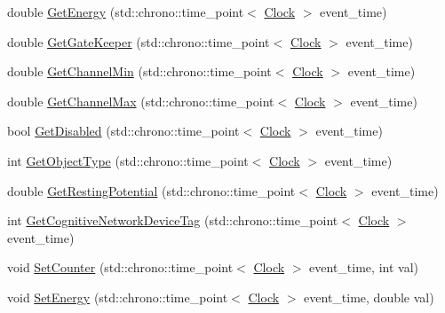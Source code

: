 \begin{DoxyCompactItemize}
\item 
double \mbox{\hyperlink{classCognitiveNetwork_af23b9bce2587ccf3c8204be33fc76c61}{Get\+Energy}} (std\+::chrono\+::time\+\_\+point$<$ \mbox{\hyperlink{universe_8h_a0ef8d951d1ca5ab3cfaf7ab4c7a6fd80}{Clock}} $>$ event\+\_\+time)
\item 
double \mbox{\hyperlink{classCognitiveNetwork_a3a9be1c6697d063b0836cdcdc7a2600c}{Get\+Gate\+Keeper}} (std\+::chrono\+::time\+\_\+point$<$ \mbox{\hyperlink{universe_8h_a0ef8d951d1ca5ab3cfaf7ab4c7a6fd80}{Clock}} $>$ event\+\_\+time)
\item 
double \mbox{\hyperlink{classCognitiveNetwork_ad7f5cc836340017d38c22b57e177fc91}{Get\+Channel\+Min}} (std\+::chrono\+::time\+\_\+point$<$ \mbox{\hyperlink{universe_8h_a0ef8d951d1ca5ab3cfaf7ab4c7a6fd80}{Clock}} $>$ event\+\_\+time)
\item 
double \mbox{\hyperlink{classCognitiveNetwork_ab67da8690b83618d88f88411121d7071}{Get\+Channel\+Max}} (std\+::chrono\+::time\+\_\+point$<$ \mbox{\hyperlink{universe_8h_a0ef8d951d1ca5ab3cfaf7ab4c7a6fd80}{Clock}} $>$ event\+\_\+time)
\item 
bool \mbox{\hyperlink{classCognitiveNetwork_aa64c93ecec84b57b25e1fdb173795f9b}{Get\+Disabled}} (std\+::chrono\+::time\+\_\+point$<$ \mbox{\hyperlink{universe_8h_a0ef8d951d1ca5ab3cfaf7ab4c7a6fd80}{Clock}} $>$ event\+\_\+time)
\item 
int \mbox{\hyperlink{classCognitiveNetwork_a1c92a8f6c42788cf8ca890f062f853a3}{Get\+Object\+Type}} (std\+::chrono\+::time\+\_\+point$<$ \mbox{\hyperlink{universe_8h_a0ef8d951d1ca5ab3cfaf7ab4c7a6fd80}{Clock}} $>$ event\+\_\+time)
\item 
double \mbox{\hyperlink{classCognitiveNetwork_a03d744f9d0d420c1e044646bc6bd2552}{Get\+Resting\+Potential}} (std\+::chrono\+::time\+\_\+point$<$ \mbox{\hyperlink{universe_8h_a0ef8d951d1ca5ab3cfaf7ab4c7a6fd80}{Clock}} $>$ event\+\_\+time)
\item 
int \mbox{\hyperlink{classCognitiveNetwork_af33f3ff9dd829da73d183d2624f24964}{Get\+Cognitive\+Network\+Device\+Tag}} (std\+::chrono\+::time\+\_\+point$<$ \mbox{\hyperlink{universe_8h_a0ef8d951d1ca5ab3cfaf7ab4c7a6fd80}{Clock}} $>$ event\+\_\+time)
\item 
void \mbox{\hyperlink{classCognitiveNetwork_a23c6a11d9f15a141f69a9779f174bfb3}{Set\+Counter}} (std\+::chrono\+::time\+\_\+point$<$ \mbox{\hyperlink{universe_8h_a0ef8d951d1ca5ab3cfaf7ab4c7a6fd80}{Clock}} $>$ event\+\_\+time, int val)
\item 
void \mbox{\hyperlink{classCognitiveNetwork_af2f96107858445a0b7be2be6af5b5c01}{Set\+Energy}} (std\+::chrono\+::time\+\_\+point$<$ \mbox{\hyperlink{universe_8h_a0ef8d951d1ca5ab3cfaf7ab4c7a6fd80}{Clock}} $>$ event\+\_\+time, double val)

\end{DoxyCompactItemize}
